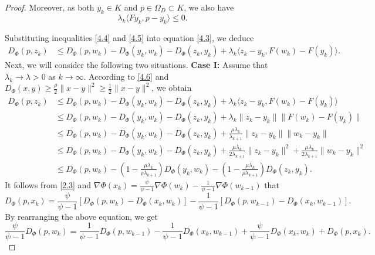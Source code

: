 \documentclass[hidelinks,11 pt]{article}
\numberwithin{equation}{section}
\theoremstyle{definition}  %
\numberwithin{equation}{section}
\numberwithin{theorem}{section}
\begin{document}
\begin{proof}
Moreover, as both \( y_k \in K \) and \( p \in \Omega_{D} \subset K \), we also have
\begin{equation*}
    \lambda_k \langle F y_k, p - y_k \rangle \leq 0. \tag{4.5}\label{4.5}
\end{equation*}

Substituting inequalities \eqref{4.4} and \eqref{4.5} into equation \eqref{4.3}, we deduce
\begin{align*}
    D_{\Phi}(p, z_k) 
    &\leq D_{\Phi}(p, w_k) - D_{\Phi}(y_k, w_k) - D_{\Phi}(z_k, y_k) + \lambda_k \langle z_k - y_k, F(w_k) - F(y_k) \rangle. \tag{4.6}\label{4.6}
\end{align*}
Next, we will consider the following two situations. 
\vskip 2mm 
\textbf{Case I:} Assume that $\lambda_{k}\to \lambda>0$ as $k\to\infty$. According to \eqref{4.6} and $D_{\Phi}(x,y)\geq \frac{\rho}{2}\|x-y\|^2\geq\frac{1}{2}\|x-y\|^2$, we obtain 
\begin{align*}
    D_{\Phi}(p, z_k) 
    &\leq D_{\Phi}(p, w_k) - D_{\Phi}(y_k, w_k) - D_{\Phi}(z_k, y_k) + \lambda_k \langle z_k - y_k, F(w_k) - F(y_k) \rangle\\
    &\leq D_{\Phi}(p, w_k) - D_{\Phi}(y_k, w_k) - D_{\Phi}(z_k, y_k) + \lambda_k \| z_k - y_k\| \|F(w_k) - F(y_k)\|\\
    & \leq D_{\Phi}(p, w_k) - D_{\Phi}(y_k, w_k) - D_{\Phi}(z_k, y_k) + \frac{\mu\lambda_{k}}{\lambda_{k+1}} \| z_k - y_k\| \|w_k - y_k\|\\
    & \leq D_{\Phi}(p, w_k) - D_{\Phi}(y_k, w_k) - D_{\Phi}(z_k, y_k) + \frac{\mu\lambda_{k}}{2\lambda_{k+1}} \| z_k - y_k\|^2 +\frac{\mu\lambda_{k}}{2\lambda_{k+1}}\|w_k - y_k\|^2\\
    & \leq D_{\Phi}(p, w_k) -\left(1-\frac{\mu\lambda_{k}}{\rho\lambda_{k+1}}\right) D_{\Phi}(y_k, w_k) -\left(1-\frac{\mu\lambda_{k}}{\rho\lambda_{k+1}}\right) D_{\Phi}(z_k, y_k).\tag{4.7}\label{4.7}
\end{align*}
It follows from \eqref{2.3} and $\nabla \Phi(x_{k})=\frac{\psi}{\psi-1}\nabla {\Phi}(w_{k})-\frac{1}{\psi-1}\nabla{\Phi}(w_{k-1})$ that 
\begin{equation*}
    D_{\Phi}(p,x_{k}) = \frac{\psi}{\psi-1}\left[D_{\Phi}(p,w_{k})-D_{\Phi}(x_{k},w_{k})\right]-\frac{1}{\psi-1}\left[D_{\Phi}(p,w_{k-1})-D_{\Phi}(x_{k},w_{k-1})\right].
\end{equation*}
By rearranging the above equation, we get 
\begin{equation*}
    \frac{\psi}{\psi-1}D_{\Phi}(p,w_{k}) = \frac{1}{\psi-1}D_{\Phi}(p,w_{k-1})-\frac{1}{\psi-1}D_{\Phi}(x_{k},w_{k-1})+\frac{\psi}{\psi-1}D_{\Phi}(x_{k},w_{k})+D_{\Phi}(p,x_{k}). \tag{4.8}\label{4.8}

\end{equation*}
\end{proof}
\end{document}

